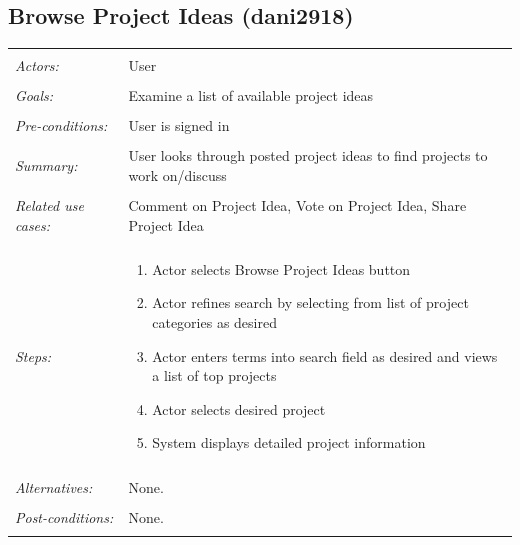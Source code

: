 \documentclass[11pt]{report}
\begin{document}
\subsection{Browse Project Ideas (dani2918)}
\begin{tabular}{ p{2cm} p{12cm} }
 \hline
 \\
 \textit{Actors:} & User \\ 
 \\
 \textit{Goals:} & Examine a list of available project ideas  \\
 \\
 \textit{Pre-conditions:} & User is signed in  \\
 \\
 \textit{Summary:} & User looks through posted project ideas to find projects to work on/discuss \\ 
 \\
 \textit{Related use cases:} & Comment on Project Idea, Vote on Project Idea, Share Project Idea \\ 
 \\
 \textit{Steps:} & \begin{enumerate}
  \item Actor selects Browse Project Ideas button
  \item Actor refines search by selecting from list of project categories as desired
  \item Actor enters terms into search field as desired and views a list of top projects
  \item Actor selects desired project
  \item System displays detailed project information
 \end{enumerate} \\
 \\
 \textit{Alternatives:} & None. \\
 \\
 \textit{Post-conditions:} & None. \\
 \\
\hline
\end{tabular}
\end{document}
